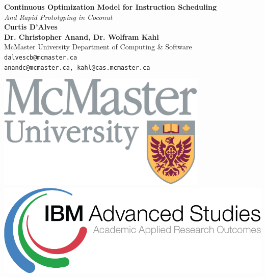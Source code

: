\documentclass[a0,landscape,24pt]{a0poster}
\begin{document}


\begin{minipage}[b]{0.75\linewidth}
\veryHuge \color{NavyBlue} \textbf{Continuous Optimization Model for Instruction Scheduling} \color{Black}\\ %
\Huge\textit{And Rapid Prototyping in Coconut}\\[2cm] %
\huge \textbf{Curtis D'Alves}\\[0.5cm] %
\huge \textbf{Dr. Christopher Anand, Dr. Wolfram Kahl}\\[0.5cm] %
\huge McMaster University Department of Computing \& Software \\[0.4cm] %
\Large \texttt{dalvescb@mcmaster.ca} \\
\Large \texttt{anandc@mcmaster.ca, kahl@cas.mcmaster.ca} \\

\end{minipage}
%
\begin{minipage}[b]{0.25\linewidth}
\includegraphics[width=10cm]{maclogo.jpg}\\
\includegraphics[width=20cm]{logo.png}\\
\end{minipage}
\end{document}

